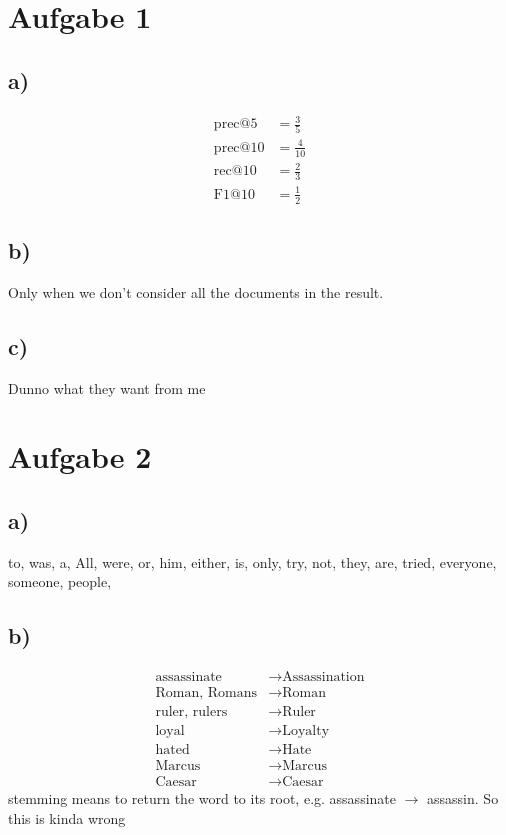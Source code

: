 \documentclass[12pt,german,a4paper]{article}
\title{#1}
\author{Mike Lenz}
\begin{document}
\maketitle	
\section*{Aufgabe 1}
\subsection*{a)}
\begin{align*}
\text{prec}@5&=\frac{ 3 }{ 5 } \\
\text{prec}@10&=\frac{ 4 }{ 10 } \\
\text{rec}@10&=\frac{ 2 }{ 3 } \\
\text{F1}@10&=\frac{ 1 }{ 2 } 
\end{align*}

\subsection*{b)}
Only when we don't consider all the documents in the result.

\subsection*{c)}
Dunno what they want from me

\section*{Aufgabe 2}
\subsection*{a)}
to, was, a, All, were, or, him, either, is, only, try, not, they, are, tried, everyone, someone, people,

\subsection*{b)}
\begin{align*}
\text{assassinate}&\rightarrow \text{Assassination}\\
\text{Roman, Romans}&\rightarrow \text{Roman}\\
\text{ruler, rulers}&\rightarrow \text{Ruler}\\
\text{loyal}&\rightarrow \text{Loyalty}\\
\text{hated}&\rightarrow \text{Hate}\\
\text{Marcus}&\rightarrow \text{Marcus}\\
\text{Caesar}&\rightarrow \text{Caesar}
\end{align*}
stemming means to return the word to its root, e.g. assassinate $\rightarrow $ assassin. So this is kinda wrong
\end{document}
